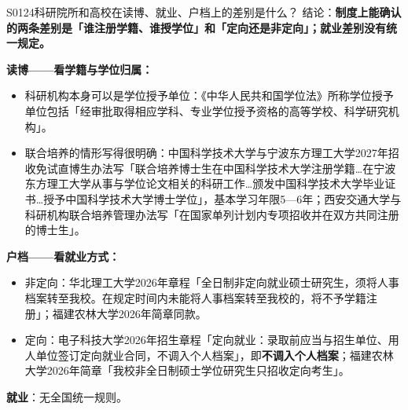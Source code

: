 \begin{qa}{S0124}{科研院所和高校在读博、就业、户档上的差别是什么？}
结论：\textbf{制度上能确认的两条差别是「谁注册学籍、谁授学位」和「定向还是非定向」；就业差别没有统一规定。}

\textbf{读博——看学籍与学位归属：}
\begin{itemize}
  \item 科研机构本身可以是学位授予单位：《中华人民共和国学位法》所称学位授予单位包括「经审批取得相应学科、专业学位授予资格的高等学校、科学研究机构」。
  \item 联合培养的情形写得很明确：中国科学技术大学与宁波东方理工大学2027年招收免试直博生办法写「联合培养博士生在中国科学技术大学注册学籍…在宁波东方理工大学从事与学位论文相关的科研工作…颁发中国科学技术大学毕业证书…授予中国科学技术大学博士学位」，基本学习年限5—6年；西安交通大学与科研机构联合培养管理办法写「在国家单列计划内专项招收并在双方共同注册的博士生」。
\end{itemize}

\textbf{户档——看就业方式：}
\begin{itemize}
  \item 非定向：华北理工大学2026年章程「全日制非定向就业硕士研究生，须将人事档案转至我校。在规定时间内未能将人事档案转至我校的，将不予学籍注册」；福建农林大学2026年简章同款。
  \item 定向：电子科技大学2026年招生章程「定向就业：录取前应当与招生单位、用人单位签订定向就业合同，不调入个人档案」，即\textbf{不调入个人档案}；福建农林大学2026年简章「我校非全日制硕士学位研究生只招收定向考生」。
\end{itemize}

\textbf{就业}：无全国统一规则。
\end{qa}

